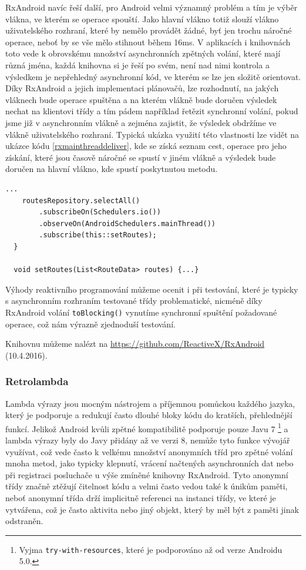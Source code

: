 \documentclass[czech,master,public,dept460,male,java,cpdeclaration]{diploma}
\begin{document}
RxAndroid navíc řeší další, pro Android velmi významný problém a tím je výběr vlákna, ve kterém se
operace spouští. Jako hlavní vlákno totiž slouží vlákno uživatelského rozhraní, které by
nemělo provádět žádné, byť jen trochu náročné operace, neboť by se vše mělo stihnout během 16ms\cite{perf}.
V aplikacích i knihovnách toto vede k obrovskému množství asynchronních zpětných volání, které mají různá jména,
každá knihovna si je řeší po svém, není nad nimi kontrola a výsledkem je nepřehledný asynchronní kód,
ve kterém se lze jen složitě orientovat. Díky RxAndroid a jejich implementaci plánovačů, lze rozhodnutí,
na jakých vláknech bude operace spuštěna a na kterém vlákně bude doručen výsledek nechat na klientovi třídy
a tím pádem například řetězit synchronní volání, pokud jsme již v asynchronním vlákně a zejména zajistit,
že výsledek obdržíme ve vlákně uživatelského rozhraní. Typická ukázka využití této vlastnosti
lze vidět na ukázce kódu \ref{rxmainthreaddeliver}, kde se získá seznam cest, operace pro jeho získání,
které jsou časově náročné se spustí v jiném vlákně a výsledek bude doručen na hlavní vlákno,
kde spustí poskytnutou metodu.


\begin{lstlisting}[label=rxmainthreaddeliver,caption=Reakce na událost v UI vlákně pomocí RxAndorid]
    ...
    routesRepository.selectAll()
        .subscribeOn(Schedulers.io())
        .observeOn(AndroidSchedulers.mainThread())
        .subscribe(this::setRoutes);
  }

  void setRoutes(List<RouteData> routes) {...}
\end{lstlisting}

Výhody reaktivního programování můžeme ocenit i při testování, které je typicky s asynchronním
rozhraním testované třídy problematické, nicméně díky RxAndroid volání \texttt{toBlocking()} vynutíme
synchronní spuštění požadované operace, což nám výrazně zjednoduší testování.

Knihovnu můžeme nalézt na \url{https://github.com/ReactiveX/RxAndroid}  (10.4.2016).

\subsubsection{Retrolambda}
Lambda výrazy jsou mocným nástrojem a příjemnou pomůckou každého jazyka, který je podporuje a redukují
často dlouhé bloky kódu do kratších, přehlednější funkcí. Jelikož Android kvůli zpětné
kompatibilitě podporuje pouze Javu 7
\footnote{Vyjma \texttt{try-with-resources}, které je podporováno až od verze Androidu 5.0.}
a lambda výrazy byly do Javy přidány až ve verzi 8, nemůže tyto funkce vývojář využívat,
což vede často k velkému množství anonymních tříd pro zpětné volání mnoha metod, jako typicky klepnutí,
vrácení načtených asynchronních dat nebo při registraci posluchače u výše zmíněné knihovny RxAndroid.
Tyto anonymní třídy značně ztěžují čitelnost kódu a velmi často vedou také k únikům paměti,
neboť anonymní třída drží implicitně referenci na instanci třídy, ve které je vytvářena, což je často
aktivita nebo jiný objekt, který by měl být z paměti jinak odstraněn.
\end{document}
